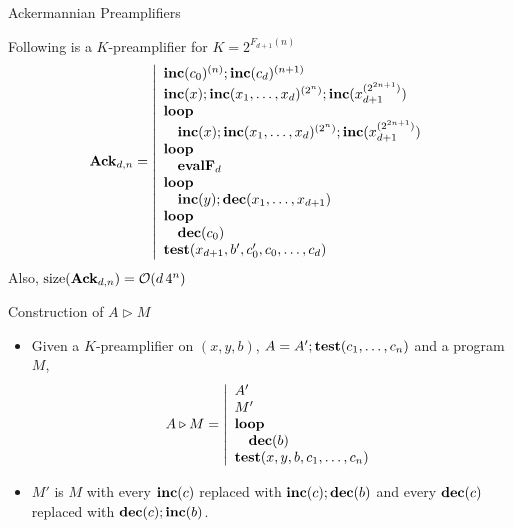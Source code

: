 \documentclass{beamer}
\renewcommand{\r}[1]{\text{\rmfamily{\textbf{#1}}}}
\newcommand{\test}[0]{\text{\rmfamily{\textbf{test}}}}
\newcommand{\inc}[0]{\text{\rmfamily{\textbf{inc}}}}
\newcommand{\dec}[0]{\text{\rmfamily{\textbf{dec}}}}
\newcommand{\lo}[0]{\text{\rmfamily{\textbf{loop}}}}
\begin{document}
\begin{frame}{Ackermannian Preamplifiers}

Following is a $K$-preamplifier for $K = 2^{F_{d+1}(n)}$
       $$\r{Ack}_{d,n} = \left\vert \begin{array}{l}
            \inc(c_0)^{(n)};\inc(c_d)^{(n+1)} \\
            \inc(x) ; \inc(x_1,\dots,x_d)^{(2^n)}; \inc(x_{d+1}^{(2^{2n+1})}) \\
            \lo \\
            \quad \inc(x) ; \inc(x_1,\dots,x_d)^{(2^n)}; \inc(x_{d+1}^{(2^{2n+1})}) \\
            \lo \\
            \quad \r{evalF}_d \\
            \lo \\
            \quad \inc(y);\dec(x_1,\dots,x_{d+1}) \\
            \lo \\
            \quad \dec(c_0) \\
            \test(x_{d+1},b',c_0',c_0,\dots,c_d) 
    \end{array} \right.$$
Also, $\text{size}(\r{Ack}_{d,n}) = \mathcal{O}(d\,4^n)$
\end{frame}

\begin{frame}{Construction of $A\triangleright M$}
       \begin{itemize}
           \item Given a $K$-preamplifier on $(x,y,b)$, $A = A';\test(c_1,\dots,c_n)$ and a program $M$,
           $$A\triangleright M = \left\vert \begin{array}{l}
            A' \\
            M' \\
            \lo \\
            \quad \dec(b) \\
            \test(x,y,b,c_1,\dots,c_n) 
    \end{array} \right.$$

     \item $M'$ is $M$ with every $\inc(c)$ replaced with $\inc(c);\dec(b)$ and every $\dec(c)$ replaced with $\dec(c);\inc(b)$.
       \end{itemize}
\end{frame}
\end{document}
